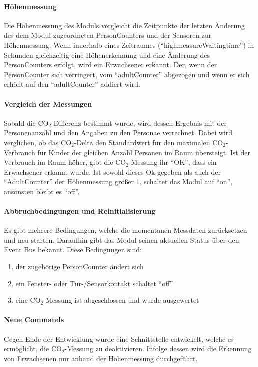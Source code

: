 \paragraph{Höhenmessung}
Die Höhenmessung des Moduls vergleicht die Zeitpunkte der letzten Änderung des dem Modul zugeordneten PersonCounters und der Sensoren zur Höhenmessung. Wenn innerhalb eines Zeitraumes ("`highmeasureWaitingtime"') in Sekunden gleichzeitig eine Höhenerkennung und eine Änderung des PersonCounters erfolgt, wird ein Erwachsener erkannt. Der, wenn der PersonCounter sich verringert, vom "`adultCounter"' abgezogen und wenn er sich erhöht auf den "`adultCounter"' addiert wird.

\paragraph{Vergleich der Messungen}
Sobald die CO$_2$-Differenz bestimmt wurde, wird dessen Ergebnis mit der Personenanzahl und den Angaben zu den Personae verrechnet. Dabei wird verglichen, ob das CO$_2$-Delta den Standardwert für den maximalen CO$_2$-Verbrauch für Kinder der gleichen Anzahl Personen im Raum übersteigt. Ist der Verbrauch im Raum höher, gibt die CO$_2$-Messung ihr "`OK"', dass ein Erwachsener erkannt wurde. Ist sowohl dieses Ok gegeben als auch der "`AdultCounter"' der Höhenmessung größer 1, schaltet das Modul auf "`on"', ansonsten bleibt es "`off"'.

\paragraph{Abbruchbedingungen und Reinitialisierung}
Es gibt mehrere Bedingungen, welche die momentanen Messdaten zurücksetzen und neu starten. Daraufhin gibt das Modul seinen aktuellen Status über den Event Bus bekannt. Diese Bedingungen sind:
\begin{enumerate}
	\item der zugehörige PersonCounter ändert sich
	\item ein Fenster- oder Tür-/Sensorkontakt schaltet "`off"'
	\item eine CO$_2$-Messung ist abgeschlossen und wurde ausgewertet
\end{enumerate}

\paragraph{Neue Commands}
Gegen Ende der Entwicklung wurde eine Schnittstelle entwickelt, welche es ermöglicht, die CO$_2$-Messung zu deaktivieren. Infolge dessen wird die Erkennung von Erwachsenen nur anhand der Höhenmessung durchgeführt.

